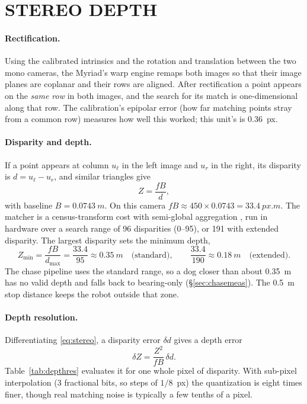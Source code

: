 \section{STEREO DEPTH}
\label{sec:stereo}

\paragraph{Rectification.} Using the calibrated intrinsics and the rotation
and translation between the two mono cameras, the Myriad's warp engine
remaps both images so that their image planes are coplanar and their rows
are aligned. After rectification a point appears on the \emph{same row} in
both images, and the search for its match is one-dimensional along that
row. The calibration's epipolar error (how far matching points stray from a
common row) measures how well this worked; this unit's is 0.36~px.

\paragraph{Disparity and depth.} If a point appears at column $u_\ell$ in
the left image and $u_r$ in the right, its disparity is $d=u_\ell-u_r$, and
similar triangles give
\begin{equation}\label{eq:stereo}
Z=\frac{fB}{d},
\end{equation}
with baseline $B=\SI{0.0743}{m}$. On this camera $fB\approx
450\times0.0743=\SI{33.4}{px.m}$. The matcher is a census-transform cost
with semi-global aggregation \cite{hirschmuller2008stereo}, run in hardware
over a search range of 96 disparities (0--95), or 191 with extended
disparity. The largest disparity sets the minimum depth,
\begin{equation}
Z_{\min}=\frac{fB}{d_{\max}}=\frac{33.4}{95}\approx\SI{0.35}{m}
\quad\text{(standard)},\qquad
\frac{33.4}{190}\approx\SI{0.18}{m}\quad\text{(extended)}.
\end{equation}
The chase pipeline uses the standard range, so a dog closer than about
\SI{0.35}{m} has no valid depth and falls back to bearing-only
(\S\ref{sec:chasemeas}). The \SI{0.5}{m} stop distance keeps the robot outside
that zone.

\paragraph{Depth resolution.} Differentiating \eqref{eq:stereo}, a disparity
error $\delta d$ gives a depth error
\begin{equation}\label{eq:depthres}
\delta Z = \frac{Z^2}{fB}\,\delta d .
\end{equation}
Table~\ref{tab:depthres} evaluates it for one whole pixel of disparity. With
sub-pixel interpolation (3 fractional bits, so steps of $1/8$~px) the
quantization is eight times finer, though real matching noise is typically
a few tenths of a pixel.


